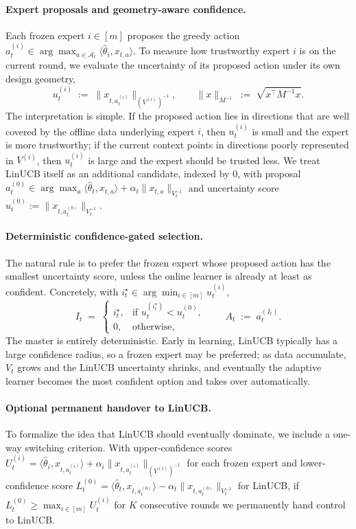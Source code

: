 \documentclass{article}
\theoremstyle{definition}
\theoremstyle{remark}
\theoremstyle{remark}
\begin{document}
\paragraph{Expert proposals and geometry-aware confidence.}
Each frozen expert $i\in[m]$ proposes the greedy action
$a_t^{(i)}\in\arg\max_{a\in\mathcal A_t}\langle\widehat\theta_i,x_{t,a}\rangle$.
To measure how trustworthy expert $i$ is on the current round, we
evaluate the uncertainty of its proposed action under its own design
geometry,
\[
u_t^{(i)} \;:=\; \bigl\|x_{t,a_t^{(i)}}\bigr\|_{(V^{(i)})^{-1}},
\qquad
\|x\|_{M^{-1}} \;:=\; \sqrt{x^\top M^{-1}x}.
\]
The interpretation is simple. If the proposed action lies in directions
that are well covered by the offline data underlying expert $i$, then
$u_t^{(i)}$ is small and the expert is more trustworthy; if the current
context points in directions poorly represented in $V^{(i)}$, then
$u_t^{(i)}$ is large and the expert should be trusted less. We treat
LinUCB itself as an additional candidate, indexed by $0$, with proposal
$a_t^{(0)}\in\arg\max_a\langle\widehat\theta_t,x_{t,a}\rangle+\alpha_t\|x_{t,a}\|_{V_t^{-1}}$
and uncertainty score $u_t^{(0)} := \|x_{t,a_t^{(0)}}\|_{V_t^{-1}}$.

\paragraph{Deterministic confidence-gated selection.}
The natural rule is to prefer the frozen expert whose proposed action
has the smallest uncertainty score, unless the online learner is
already at least as confident. Concretely, with
$i_t^\star\in\arg\min_{i\in[m]}u_t^{(i)}$,
\[
I_t \;=\;
\begin{cases}
i_t^\star, & \text{if }u_t^{(i_t^\star)}<u_t^{(0)},\\[2pt]
0, & \text{otherwise},
\end{cases}
\qquad A_t \;:=\; a_t^{(I_t)}.
\]
The master is entirely deterministic. Early in learning, LinUCB
typically has a large confidence radius, so a frozen expert may be
preferred; as data accumulate, $V_t$ grows and the LinUCB uncertainty
shrinks, and eventually the adaptive learner becomes the most confident
option and takes over automatically.

\paragraph{Optional permanent handover to LinUCB.}
To formalize the idea that LinUCB should eventually dominate, we include
a one-way switching criterion. With upper-confidence scores
$U_t^{(i)} = \langle\widehat\theta_i,x_{t,a_t^{(i)}}\rangle + \alpha_i\|x_{t,a_t^{(i)}}\|_{(V^{(i)})^{-1}}$
for each frozen expert and lower-confidence score
$L_t^{(0)} = \langle\widehat\theta_t,x_{t,a_t^{(0)}}\rangle - \alpha_t\|x_{t,a_t^{(0)}}\|_{V_t^{-1}}$
for LinUCB, if $L_t^{(0)} \ge \max_{i\in[m]} U_t^{(i)}$ for $K$
consecutive rounds we permanently hand control to LinUCB.
\end{document}
